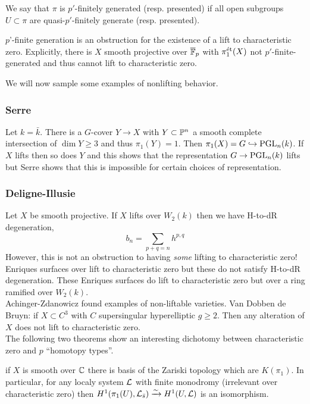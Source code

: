 \documentclass[12pt]{article}
\begin{document}
\begin{defn}
We say that $\pi$ is $p'$-finitely generated (resp. presented) if all open subgroups $U \subset \pi$ are quasi-$p'$-finitely generate (resp. presented).
\end{defn}

\begin{theorem}
$p$'-finite generation is an obstruction for the existence of a lift to characteristic zero. Explicitly, there is $X$ smooth projective over $\overline{\FF}_p$ with $\pi_1^{\et}(X)$ not $p'$-finite-generated and thus cannot lift to characteristic zero.
\end{theorem}

\noindent
We will now sample some examples of nonlifting behavior. 

\subsubsection{Serre}

Let $k = \bar{k}$. There is a $G$-cover $Y \to X$ with $Y \subset \P^n$ a smooth complete intersection of $\dim{Y} \ge 3$ and thus $\pi_1(Y) = 1$. Then $\pi_1(X) = G \embed \PGL_n(k)$. If $X$ lifts then so does $Y$ and this shows that the representation $G \to \PGL_n(k)$ lifts but Serre shows that this is impossible for certain choices of representation.

\subsubsection{Deligne-Illusie}

Let $X$ be smooth projective. If $X$ lifts over $W_2(k)$ then we have H-to-dR degeneration,
\[ b_n = \sum_{p + q = n} h^{p,q} \]
However, this is not an obstruction to having \textit{some} lifting to characteristic zero! Enriques surfaces over lift to characteristic zero but these do not satisfy H-to-dR degeneration. These Enriques surfaces do lift to characteristic zero but over a ring ramified over $W_2(k)$.
\bigskip\\
Achinger-Zdanowicz found examples of non-liftable varieties. Van Dobben de Bruyn: if $X \subset C^3$ with $C$ supersingular hyperelliptic $g \ge 2$. Then any alteration of $X$ does not lift to characteristic zero.
\bigskip\\
The following two theorems show an interesting dichotomy between characteristic zero and $p$ ``homotopy types''.  

\begin{thm}[Artin]
if $X$ is smooth over $\CC$ there is basis of the Zariski topology which are $K(\pi_1)$. In particular, for any localy system $\L$ with finite monodromy (irrelevant over characteristic zero) then $H^1(\pi_1(U), \L_{\bar{s}}) \iso H^1(U, \L)$ is an isomorphism. 
\end{thm}
\end{document}
